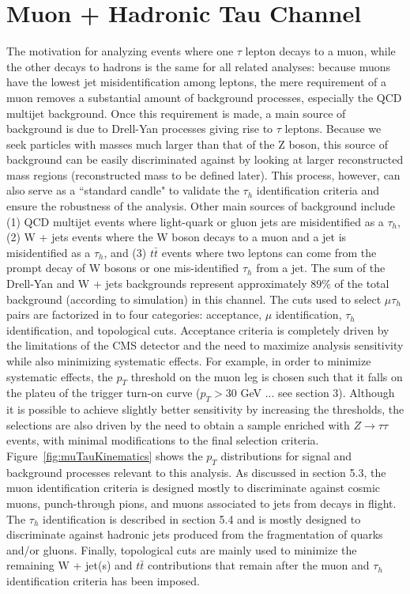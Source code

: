 \section{Muon + Hadronic Tau Channel}\label{sec:muTauhad}

The motivation for analyzing events where one $\tau$ lepton decays to a muon,
while the other decays to hadrons is the same for all \ditau related analyses: because
muons have the lowest jet misidentification among leptons, the mere requirement of a
muon removes a substantial amount of background processes, especially the QCD multijet background. Once this requirement
is made, a main source of background is due to Drell-Yan
processes giving rise to $\tau$ leptons. Because we seek particles with masses
much larger than that of the Z boson, this source of background can be easily discriminated
against by looking at larger reconstructed \ditau mass regions (reconstructed mass to be defined later). This process,
however, can also serve as a ``standard candle" to validate the $\tau_{h}$ identification criteria and
ensure the robustness of the analysis. Other main sources 
of background include (1) QCD multijet events where light-quark or gluon jets are misidentified 
as a $\tau_{h}$, (2) W + jets events where the W boson decays to a muon and a jet is
misidentified as a $\tau_{h}$, and (3) $t\bar{t}$ events where two leptons can
come from the prompt decay of W bosons or one mis-identified $\tau_{h}$ from a jet. The sum of the Drell-Yan and W + jets backgrounds represent 
approximately $89$\% of the total background (according to simulation) in this channel.  The 
cuts used to select $\mu\tau_{h}$ pairs are factorized in to four categories: acceptance, 
$\mu$ identification, $\tau_{h}$ identification, and topological cuts. Acceptance criteria is completely
driven by the limitations of the CMS detector and the need to maximize analysis
sensitivity while also minimizing systematic effects. For example, in order to minimize systematic effects, the
$p_{T}$ threshold on the muon leg is chosen such that it falls on the plateu of the trigger turn-on curve ($p_{T} > 30$ GeV ... see section 3). 
Although it is possible to achieve slightly better sensitivity by increasing the thresholds,
the selections are also driven by the need to obtain a sample enriched with $Z\to\tau\tau$ events, 
with minimal modifications to the final selection criteria. 
Figure~\ref{fig:muTauKinematics} shows 
the $p_{T}$ distributions for signal and background processes relevant to this analysis. 
As discussed in section 5.3, the muon identification criteria is designed mostly to discriminate
against cosmic muons, punch-through pions, and muons associated to jets 
from decays in flight. The $\tau_{h}$ identification is described in section 5.4 and is mostly designed to
discriminate against hadronic jets produced from the fragmentation of quarks and/or
gluons. Finally, topological cuts are mainly used to minimize the remaining W + jet(s)
and $t\bar{t}$ contributions that remain after the muon and $\tau_{h}$ identification criteria has been
imposed. 


